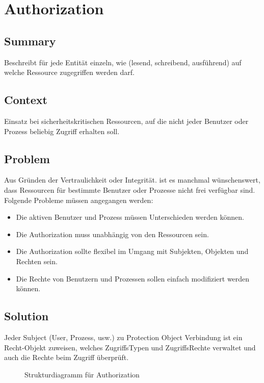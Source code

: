\chapter{Authorization}

\section{Summary}
Beschreibt für jede Entität einzeln, wie (lesend, schreibend, ausführend) auf welche Ressource zugegriffen werden darf.

\section{Context}
Einsatz bei sicherheitskritischen Ressourcen, auf die nicht jeder Benutzer oder Prozess beliebig Zugriff erhalten soll.

\section{Problem}
Aus Gründen der Vertraulichkeit oder Integrität. ist es manchmal wünschenswert, dass Ressourcen für bestimmte Benutzer oder Prozesse nicht frei verfügbar sind. Folgende Probleme müssen angegangen werden:\\
\begin{itemize}{}{ }
  \item Die aktiven Benutzer und Prozess müssen Unterschieden werden können.
  \item Die Authorization muss unabhängig von den Ressourcen sein.
  \item Die Authorization sollte flexibel im Umgang mit Subjekten, Objekten und Rechten sein.
  \item Die Rechte von Benutzern und Prozessen sollen einfach modifiziert werden können.
\end{itemize}

\section{Solution}
Jeder Subject (User, Prozess, usw.) zu Protection Object Verbindung ist ein Recht-Objekt zuweisen, welches ZugriffsTypen und ZugriffsRechte verwaltet und auch die Rechte beim Zugriff überprüft.

\begin{figure}[H]
  \centering
  
  \caption{Strukturdiagramm f\"ur Authorization}
\end{figure}

